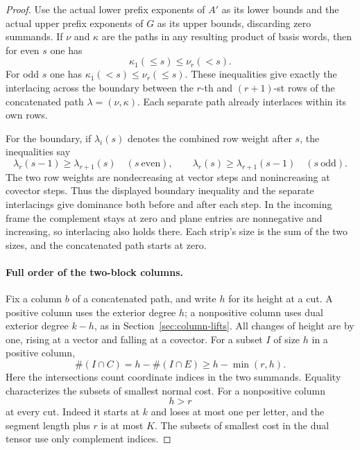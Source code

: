 \begin{proof}
Use the actual lower prefix exponents of \(A'\) as its lower
bounds and the actual upper prefix exponents of \(G\) as its
upper bounds, discarding zero summands. If \(\nu\) and
\(\kappa\) are the paths in any resulting product of basis
words, then for even \(s\) one has
\[
 \kappa_1(\le s)\le\nu_r(<s).
\]
For odd \(s\) one has
\(\kappa_1(<s)\le\nu_r(\le s)\).
These inequalities give exactly the interlacing across the
boundary between the \(r\)-th and \((r+1)\)-st rows of the
concatenated path \(\lambda=(\nu,\kappa)\). Each separate path already interlaces within its own rows.

For the boundary, if \(\lambda_i(s)\) denotes the combined
row weight after \(s\), the inequalities say
\[
 \lambda_r(s-1)\ge\lambda_{r+1}(s)\quad(s\ \mathrm{even}),
 \qquad
 \lambda_r(s)\ge\lambda_{r+1}(s-1)\quad(s\ \mathrm{odd}).
\]
The two row weights are nondecreasing at vector steps and
nonincreasing at covector steps. Thus the displayed boundary
inequality and the separate interlacings give dominance
both before and after each step. In the incoming frame
the complement stays at zero and plane entries are nonnegative
and increasing, so interlacing also holds there. Each strip's
size is the sum of the two sizes, and the concatenated path
starts at zero.

\paragraph{Full order of the two-block columns.}
\label{par:plane-column-orders}
Fix a column \(b\) of a concatenated path, and write \(h\) for
its height at a cut. A positive column uses the exterior
degree \(h\); a nonpositive column uses dual exterior degree
\(k-h\), as in Section~\ref{sec:column-lifts}. All changes of
height are by one, rising at a vector and falling at a
covector. For a subset \(I\) of size \(h\) in a positive column,
\[
 \#(I\cap C)=h-\#(I\cap E)\ge h-\min(r,h).
\]
Here the intersections count coordinate indices in the two summands. Equality characterizes the subsets of smallest normal cost. For a
nonpositive column
\[
 h>r
\]
at every cut. Indeed it starts at
\(k\) and loses at most one per letter, and the segment length
plus \(r\) is at most \(K\). The subsets of smallest cost
in the dual tensor use only complement indices.


\end{proof}
